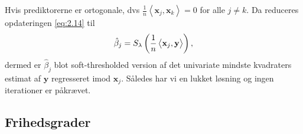 Hvis prediktorerne er ortogonale, dvs $\frac{1}{n} \left\langle \mathbf{x}_j, \mathbf{x}_k \right\rangle = 0$ for alle $j \neq k$.
Da reduceres opdateringen \eqref{eq:2.14} til
\begin{align*}
\hat{\beta}_j = S_\lambda \del{\frac{1}{n} \left\langle \mathbf{x}_j, \mathbf{y} \right\rangle},
\end{align*}
dermed er $\hat{\beta}_j$ blot soft-thresholded version af det univariate mindste kvadraters estimat af $\mathbf{y}$ regresseret imod $\mathbf{x}_j$. Således har vi en lukket løsning og ingen iterationer er påkrævet.

\subsection{Frihedsgrader}
 